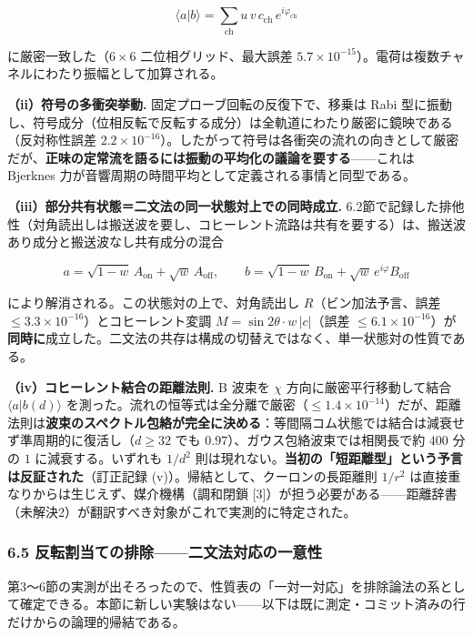 \documentclass[
  a4paper,
]{ltjsarticle}
\begin{document}
\[
\langle a|b\rangle=\sum_{\text{ch}}u\,v\,c_{\text{ch}}\,e^{i\varphi_{\text{ch}}}
\]

に厳密一致した（\(6\times6\) 二位相グリッド、最大誤差
\(5.7\times10^{-15}\)）。電荷は複数チャネルにわたり振幅として加算される。

\textbf{（ii）符号の多衝突挙動.} 固定プローブ回転の反復下で、移乗は Rabi
型に振動し、符号成分（位相反転で反転する成分）は全軌道にわたり厳密に鏡映である（反対称性誤差
\(2.2\times10^{-16}\)）。したがって符号は各衝突の流れの向きとして厳密だが、\textbf{正味の定常流を語るには振動の平均化の議論を要する}------これは
Bjerknes 力が音響周期の時間平均として定義される事情と同型である。

\textbf{（iii）部分共有状態＝二文法の同一状態対上での同時成立.}
6.2節で記録した排他性（対角読出しは搬送波を要し、コヒーレント流路は共有を要する）は、搬送波あり成分と搬送波なし共有成分の混合

\[
a=\sqrt{1-w}\,A_{\mathrm{on}}+\sqrt{w}\,A_{\mathrm{off}},\qquad
b=\sqrt{1-w}\,B_{\mathrm{on}}+\sqrt{w}\,e^{i\varphi}B_{\mathrm{off}}
\]

により解消される。この状態対の上で、対角読出し \(R\)（ビン加法予言、誤差
\(\le3.3\times10^{-16}\)）とコヒーレント変調
\(M=\sin2\theta\cdot w\,|c|\)（誤差
\(\le6.1\times10^{-16}\)）が\textbf{同時に}成立した。二文法の共存は構成の切替えではなく、単一状態対の性質である。

\textbf{（iv）コヒーレント結合の距離法則.} B 波束を \(\chi\)
方向に厳密平行移動して結合 \(\langle a|b(d)\rangle\)
を測った。流れの恒等式は全分離で厳密（\(\le1.4\times10^{-14}\)）だが、距離法則は\textbf{波束のスペクトル包絡が完全に決める}：等間隔コム状態では結合は減衰せず準周期的に復活し（\(d\ge32\)
でも \(0.97\)）、ガウス包絡波束では相関長で約 \(400\) 分の \(1\)
に減衰する。いずれも \(1/d^2\)
則は現れない。\textbf{当初の「短距離型」という予言は反証された}（訂正記録
(v)）。帰結として、クーロンの長距離則 \(1/r^2\)
は直接重なりからは生じえず、媒介機構（調和閉鎖
{[}3{]}）が担う必要がある------距離辞書（未解決2）が翻訳すべき対象がこれで実測的に特定された。

\subsubsection{6.5
反転割当ての排除------二文法対応の一意性}\label{ux53cdux8ee2ux5272ux5f53ux3066ux306eux6392ux9664ux4e8cux6587ux6cd5ux5bfeux5fdcux306eux4e00ux610fux6027}

第3〜6節の実測が出そろったので、性質表の「一対一対応」を排除論法の系として確定できる。本節に新しい実験はない------以下は既に測定・コミット済みの行だけからの論理的帰結である。
\end{document}

